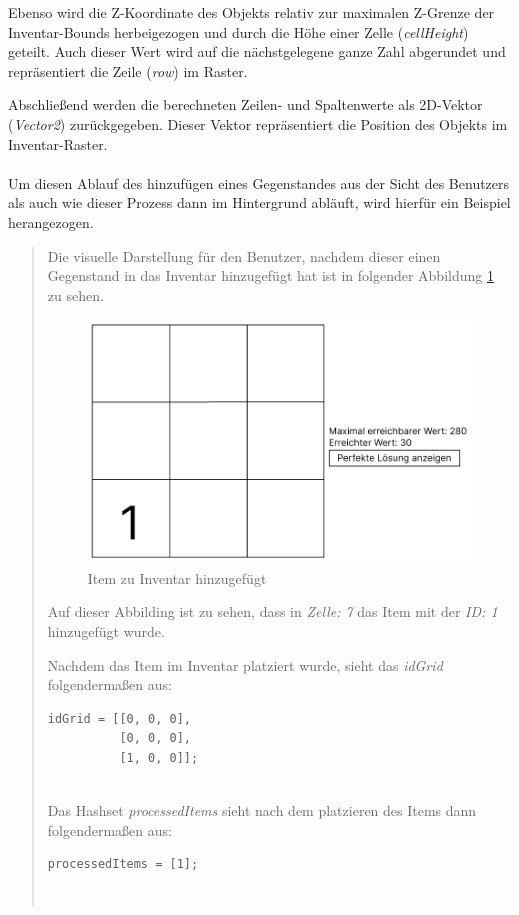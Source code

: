 Ebenso wird die Z-Koordinate des Objekts relativ zur maximalen Z-Grenze der Inventar-Bounds herbeigezogen und durch die
Höhe einer Zelle (\textit{cellHeight}) geteilt. Auch dieser Wert wird auf die nächstgelegene ganze Zahl abgerundet und
repräsentiert die Zeile (\textit{row}) im Raster.

Abschließend werden die berechneten Zeilen- und Spaltenwerte als 2D-Vektor (\textit{Vector2}) zurückgegeben. Dieser
Vektor repräsentiert die Position des Objekts im Inventar-Raster.\\
\\
Um diesen Ablauf des hinzufügen eines Gegenstandes aus der Sicht des Benutzers als auch wie dieser Prozess dann im
Hintergrund abläuft, wird hierfür ein Beispiel herangezogen.

\begin{quote}
Die visuelle Darstellung für den Benutzer, nachdem dieser einen Gegenstand in das Inventar hinzugefügt hat ist in
folgender Abbildung \ref{fig:controller_itemAdded} zu sehen.

\begin{figure}[h]
\centering
\includegraphics[scale=0.6]{images/itemAdded}
\caption{Item zu Inventar hinzugefügt}
\label{fig:controller_itemAdded}
\end{figure}

Auf dieser Abbilding ist zu sehen, dass in \textit{Zelle: 7} das Item mit der \textit{ID: 1} hinzugefügt wurde.

Nachdem das Item im Inventar platziert wurde, sieht das \textit{idGrid} folgendermaßen aus:
\begin{lstlisting}[style=csharp label=code:controller_savedID]
idGrid = [[0, 0, 0],
          [0, 0, 0],
          [1, 0, 0]];
\end{lstlisting}\\

Das Hashset \textit{processedItems} sieht nach dem platzieren des Items dann folgendermaßen aus:
\begin{lstlisting}[style=csharp label=code:controller_savedID]
processedItems = [1];
\end{lstlisting}\\
\end{quote}

